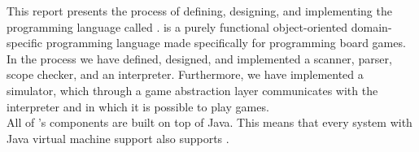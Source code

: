 This report presents the process of defining, designing, and
implementing the programming language called \productname{}.
\productname{} is a purely functional object-oriented domain-specific
programming language made specifically for programming board games. \\

In the process we have defined, designed, and implemented a scanner,    
parser, scope checker, and an interpreter. Furthermore, we have         
implemented a simulator, which through a game abstraction layer          
communicates with the interpreter and in which it is possible to play    
\productname{} games. \\

All of \productname{}'s components are built on top of Java. This means
that every system with Java virtual machine support also supports
\productname{}. \\
